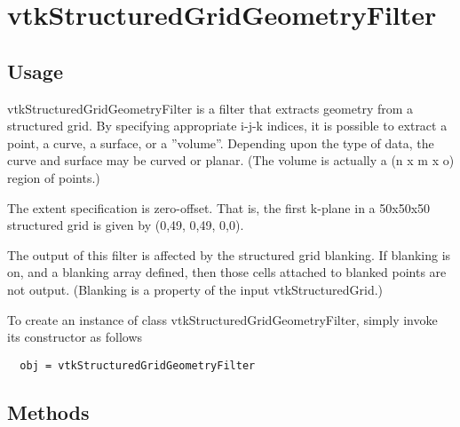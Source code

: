 \section{vtkStructuredGridGeometryFilter}

\subsection{Usage}

 vtkStructuredGridGeometryFilter is a filter that extracts geometry from a
 structured grid. By specifying appropriate i-j-k indices, it is possible
 to extract a point, a curve, a surface, or a ''volume''. Depending upon the
 type of data, the curve and surface may be curved or planar. (The volume
 is actually a (n x m x o) region of points.)

 The extent specification is zero-offset. That is, the first k-plane in
 a 50x50x50 structured grid is given by (0,49, 0,49, 0,0).

 The output of this filter is affected by the structured grid blanking.
 If blanking is on, and a blanking array defined, then those cells 
 attached to blanked points are not output. (Blanking is a property of
 the input vtkStructuredGrid.)

To create an instance of class vtkStructuredGridGeometryFilter, simply
invoke its constructor as follows
\begin{verbatim}
  obj = vtkStructuredGridGeometryFilter
\end{verbatim}
\subsection{Methods}

